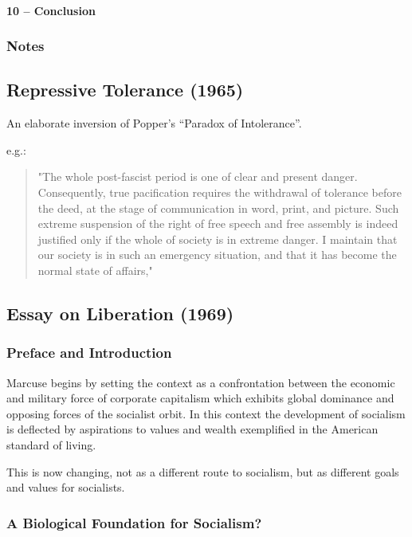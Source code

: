 \documentclass[10pt,titlepage]{book}
\begin{document}
\paragraph{10 – Conclusion}
\subsubsection{Notes}


\subsection{Repressive Tolerance (1965)\cite{marcuse-repressive}}

An elaborate inversion of Popper's ``Paradox of Intolerance''.

e.g.:

\begin{quotation}
"The whole post-fascist period is one of clear and present danger. Consequently, true pacification requires the withdrawal of tolerance before the deed, at the stage of communication in word, print, and picture. Such extreme suspension of the right of free speech and free assembly is indeed justified only if the whole of society is in extreme danger. I maintain that our society is in such an emergency situation, and that it has become the normal state of affairs,"
\end{quotation}

  
\subsection{Essay on Liberation (1969)\cite{marcuse-liberation}}

\subsubsection{Preface and Introduction}

Marcuse begins by setting the context as a confrontation between the economic and military force of corporate capitalism which exhibits global dominance and opposing forces of the socialist orbit.
In this context the development of socialism is deflected by aspirations to values and wealth exemplified in the American standard of living.

This is now changing, not as a different route to socialism, but as different goals and values for socialists.


\subsubsection{A Biological Foundation for Socialism?}
\end{document}
